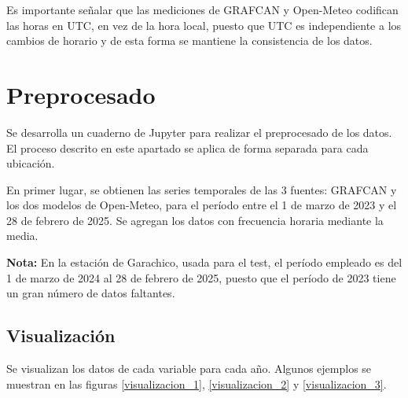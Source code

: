 Es importante señalar que las mediciones de GRAFCAN y Open-Meteo codifican las horas en UTC, en vez de la hora local, puesto que UTC es independiente a los cambios de horario
y de esta forma se mantiene la consistencia de los datos.

\section{Preprocesado}

Se desarrolla un cuaderno de Jupyter para realizar el preprocesado de los datos. El proceso descrito en este apartado
se aplica de forma separada para cada ubicación.

En primer lugar, se obtienen las series temporales de las 3 fuentes: GRAFCAN y los dos modelos de Open-Meteo, para el período entre el 1 de marzo de 2023 y el 28 de febrero de 2025.
Se agregan los datos con frecuencia horaria mediante la media. 

\textbf{Nota:} En la estación de Garachico, usada para el test, el período empleado es del 1 de marzo de 2024 al 28 de febrero de 2025, puesto que el período de 2023 tiene 
un gran número de datos faltantes.

\subsection{Visualización}
Se visualizan los datos de cada variable para cada año. Algunos ejemplos se muestran en las figuras \ref{visualizacion_1}, \ref{visualizacion_2} y \ref{visualizacion_3}.

